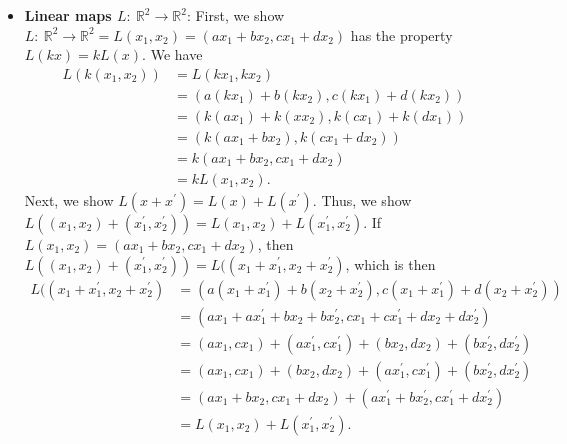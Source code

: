 \documentclass{report}
\begin{document}
\begin{itemize}
        \item \textbf{Linear maps $L:\ \mathbb{R}^{2} \to \mathbb{R}^{2}$}: 
            \bigbreak \noindent 
            First, we show $L:\ \mathbb{R}^{2} \to \mathbb{R}^{2} = L(x_{1}, x_{2}) = (ax_{1} + bx_{2}, cx_{1} + dx_{2})$ has the property $L(kx) = kL(x)$. We have
            \begin{align*}
                L(k(x_{1}, x_{2})) &= L(kx_{1}, kx_{2})  \\
                                   &= (a(kx_{1}) + b(kx_{2}), c(kx_{1}) + d(kx_{2})) \\
                                   &= ( k(ax_{1}) + k(xx_{2}), k(cx_{1}) + k(dx_{1})) \\
                                   &= (k (ax_{1} +  bx_{2}), k(cx_{1} + dx_{2})) \\
                                   &= k(ax_{1} + bx_{2}, c x_{1} + dx_{2}) \\
                                   &=kL(x_{1}, x_{2})
            .\end{align*}
            \bigbreak \noindent 
            Next, we show $L(x + x^{\prime})  =L(x) + L(x^{\prime})$. Thus, we show $L( (x_{1}, x_{2}) + (x^{\prime}_{1}, x^{\prime}_{2})) = L(x_{1}, x_{2}) + L(x^{\prime}_{1}, x^{\prime}_{2})$. If $L(x_{1}, x_{2})  = (ax_{1} + bx_{2}, cx_{1} +  dx_{2})$, then $L( (x_{1}, x_{2}) +  (x^{\prime}_{1}, x^{\prime}_{2})) = L( (x_{1} + x^{\prime}_{1}, x_{2} + x^{\prime}_{2})$, which is then
            \begin{align*}
                L( (x_{1} + x^{\prime}_{1}, x_{2} + x^{\prime}_{2}) &=   (a(x_{1} + x^{\prime}_{1}) + b(x_{2} + x^{\prime}_{2}), c(x_{1} + x^{\prime}_{1}) + d(x_{2} + x^{\prime}_{2}) )\\
                                                                    &= (ax_{1} + ax^{\prime}_{1} + bx_{2} +bx^{\prime}_{2}, cx_{1} + cx^{\prime}_{1} + dx_{2} + dx^{\prime}_{2})  \\
                                                                    &= (ax_{1}, cx_{1}) + (ax^{\prime}_{1}, cx^{\prime}_{1}) + (bx_{2}, dx_{2}) + (bx^{\prime}_{2}, dx^{\prime}_{2}) \\
                                                                    &= (ax_{1}, cx_{1}) + (bx_{2}, dx_{2}) +  (ax^{\prime}_{1}, cx^{\prime}_{1}) + (bx^{\prime}_{2}, dx^{\prime}_{2}) \\
                                                                    &= (ax_{1} + bx_{2}, cx_{1} + dx_{2}) + (ax^{\prime}_{1} + bx^{\prime}_{2}, cx^{\prime}_{1} + dx^{\prime}_{2}) \\
                                                                    &=L(x_{1}, x_{2}) + L(x^{\prime}_{1}, x^{\prime}_{2})
            .\end{align*}

 

    \end{itemize}
\end{document}
